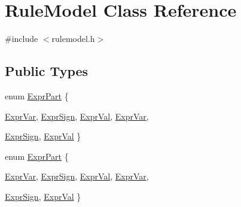 \hypertarget{class_rule_model}{
\section{RuleModel Class Reference}
\label{class_rule_model}
}


{\ttfamily \#include $<$rulemodel.h$>$}

\subsection*{Public Types}
\begin{DoxyCompactItemize}
\item 
enum \hyperlink{class_rule_model_a1010ef4729cc70469ab2a51416b32716}{ExprPart} \{ \par
\hyperlink{class_rule_model_a1010ef4729cc70469ab2a51416b32716a162bfeb0417120ccc94850d75dacc707}{ExprVar}, 
\hyperlink{class_rule_model_a1010ef4729cc70469ab2a51416b32716a44c201c128ab8444e7311a25b1a6e7ae}{ExprSign}, 
\hyperlink{class_rule_model_a1010ef4729cc70469ab2a51416b32716af69052280ca0d7f53ad727b81bfe8731}{ExprVal}, 
\hyperlink{class_rule_model_a1010ef4729cc70469ab2a51416b32716a162bfeb0417120ccc94850d75dacc707}{ExprVar}, 
\par
\hyperlink{class_rule_model_a1010ef4729cc70469ab2a51416b32716a44c201c128ab8444e7311a25b1a6e7ae}{ExprSign}, 
\hyperlink{class_rule_model_a1010ef4729cc70469ab2a51416b32716af69052280ca0d7f53ad727b81bfe8731}{ExprVal}
 \}
\item 
enum \hyperlink{class_rule_model_a1010ef4729cc70469ab2a51416b32716}{ExprPart} \{ \par
\hyperlink{class_rule_model_a1010ef4729cc70469ab2a51416b32716a162bfeb0417120ccc94850d75dacc707}{ExprVar}, 
\hyperlink{class_rule_model_a1010ef4729cc70469ab2a51416b32716a44c201c128ab8444e7311a25b1a6e7ae}{ExprSign}, 
\hyperlink{class_rule_model_a1010ef4729cc70469ab2a51416b32716af69052280ca0d7f53ad727b81bfe8731}{ExprVal}, 
\hyperlink{class_rule_model_a1010ef4729cc70469ab2a51416b32716a162bfeb0417120ccc94850d75dacc707}{ExprVar}, 
\par
\hyperlink{class_rule_model_a1010ef4729cc70469ab2a51416b32716a44c201c128ab8444e7311a25b1a6e7ae}{ExprSign}, 
\hyperlink{class_rule_model_a1010ef4729cc70469ab2a51416b32716af69052280ca0d7f53ad727b81bfe8731}{ExprVal}
 \}
\end{DoxyCompactItemize}
